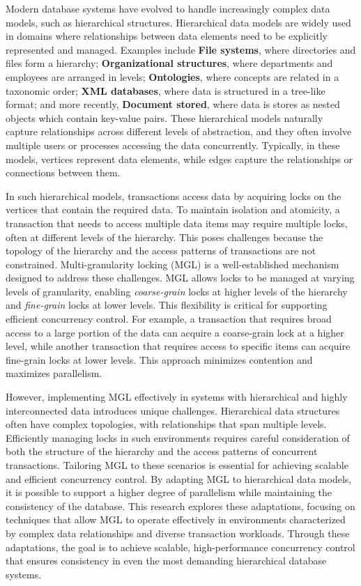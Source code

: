 Modern database systems have evolved to handle increasingly complex data models, such as hierarchical structures. Hierarchical data models are widely used in domains where relationships between data elements need to be explicitly represented and managed. Examples include \textbf{File systems}, where directories and files form a hierarchy; \textbf{Organizational structures}, where departments and employees are arranged in levels; \textbf{Ontologies}, where concepts are related in a taxonomic order; \textbf{XML databases}, where data is structured in a tree-like format; and more recently, \textbf{Document stored}, where data is stores as nested objects which contain key-value pairs. These hierarchical models naturally capture relationships across different levels of abstraction, and they often involve multiple users or processes accessing the data concurrently. Typically, in these models, vertices represent data elements, while edges capture the relationships or connections between them.

In such hierarchical models, transactions access data by acquiring locks on the vertices that contain the required data. To maintain isolation and atomicity, a transaction that needs to access multiple data items may require multiple locks, often at different levels of the hierarchy. This poses challenges because the topology of the hierarchy and the access patterns of transactions are not constrained. Multi-granularity locking (MGL) is a well-established mechanism designed to address these challenges. MGL allows locks to be managed at varying levels of granularity, enabling \emph{coarse-grain} locks at higher levels of the hierarchy and \emph{fine-grain} locks at lower levels. This flexibility is critical for supporting efficient concurrency control. For example, a transaction that requires broad access to a large portion of the data can acquire a coarse-grain lock at a higher level, while another transaction that requires access to specific items can acquire fine-grain locks at lower levels. This approach minimizes contention and maximizes parallelism.

However, implementing MGL effectively in systems with hierarchical and highly interconnected data introduces unique challenges. Hierarchical data structures often have complex topologies, with relationships that span multiple levels. Efficiently managing locks in such environments requires careful consideration of both the structure of the hierarchy and the access patterns of concurrent transactions. Tailoring MGL to these scenarios is essential for achieving scalable and efficient concurrency control. By adapting MGL to hierarchical data models, it is possible to support a higher degree of parallelism while maintaining the consistency of the database. This research explores these adaptations, focusing on techniques that allow MGL to operate effectively in environments characterized by complex data relationships and diverse transaction workloads. Through these adaptations, the goal is to achieve scalable, high-performance concurrency control that ensures consistency in even the most demanding hierarchical database systems.

